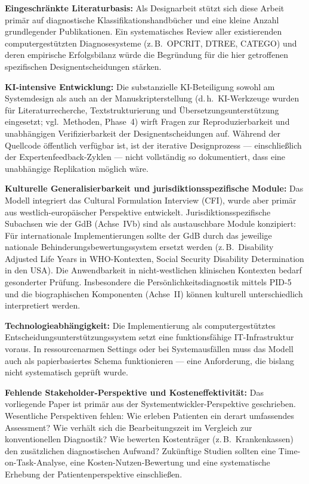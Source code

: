 \documentclass[11pt,a4paper]{article}
\begin{document}
\textbf{Eingeschr\"ankte Literaturbasis:} Als Designarbeit st\"utzt sich diese Arbeit prim\"ar auf diagnostische Klassifikationshandb\"ucher und eine kleine Anzahl grundlegender Publikationen. Ein systematisches Review aller existierenden computergest\"utzten Diagnosesysteme (z.\,B.\ OPCRIT, DTREE, CATEGO) und deren empirische Erfolgsbilanz w\"urde die Begr\"undung f\"ur die hier getroffenen spezifischen Designentscheidungen st\"arken.

\textbf{KI-intensive Entwicklung:} Die substanzielle KI-Beteiligung sowohl am Systemdesign als auch an der Manuskripterstellung (d.\,h.\ KI-Werkzeuge wurden f\"ur Literaturrecherche, Textstrukturierung und \"Ubersetzungsunterst\"utzung eingesetzt; vgl.\ Methoden, Phase~4) wirft Fragen zur Reproduzierbarkeit und unabh\"angigen Verifizierbarkeit der Designentscheidungen auf. W\"ahrend der Quellcode \"offentlich verf\"ugbar ist, ist der iterative Designprozess --- einschlie\ss{}lich der Expertenfeedback-Zyklen --- nicht vollst\"andig so dokumentiert, dass eine unabh\"angige Replikation m\"oglich w\"are.

\textbf{Kulturelle Generalisierbarkeit und jurisdiktionsspezifische Module:} Das Modell integriert das Cultural Formulation Interview (CFI), wurde aber prim\"ar aus westlich-europ\"aischer Perspektive entwickelt. Jurisdiktionsspezifische Subachsen wie der GdB (Achse~IVb) sind als austauschbare Module konzipiert: F\"ur internationale Implementierungen sollte der GdB durch das jeweilige nationale Behinderungsbewertungssystem ersetzt werden (z.\,B.\ Disability Adjusted Life Years in WHO-Kontexten, Social Security Disability Determination in den USA). Die Anwendbarkeit in nicht-westlichen klinischen Kontexten bedarf gesonderter Pr\"ufung. Insbesondere die Pers\"onlichkeitsdiagnostik mittels PID-5 und die biographischen Komponenten (Achse~II) k\"onnen kulturell unterschiedlich interpretiert werden.

\textbf{Technologieabh\"angigkeit:} Die Implementierung als computergest\"utztes Entscheidungsunterst\"utzungssystem setzt eine funktionsf\"ahige IT-Infrastruktur voraus. In ressourcenarmen Settings oder bei Systemausf\"allen muss das Modell auch als papierbasiertes Schema funktionieren --- eine Anforderung, die bislang nicht systematisch gepr\"uft wurde.

\textbf{Fehlende Stakeholder-Perspektive und Kosteneffektivit\"at:} Das vorliegende Paper ist prim\"ar aus der Systementwickler-Perspektive geschrieben. Wesentliche Perspektiven fehlen: Wie erleben Patienten ein derart umfassendes Assessment? Wie verh\"alt sich die Bearbeitungszeit im Vergleich zur konventionellen Diagnostik? Wie bewerten Kostentr\"ager (z.\,B.\ Krankenkassen) den zus\"atzlichen diagnostischen Aufwand? Zuk\"unftige Studien sollten eine Time-on-Task-Analyse, eine Kosten-Nutzen-Bewertung und eine systematische Erhebung der Patientenperspektive einschlie\ss{}en.
\end{document}
